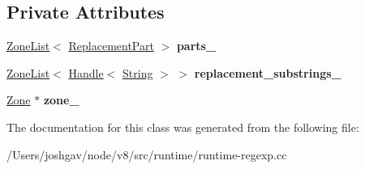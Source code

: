 \subsection*{Private Attributes}
\begin{DoxyCompactItemize}
\item 
\hyperlink{classv8_1_1internal_1_1_zone_list}{Zone\+List}$<$ \hyperlink{structv8_1_1internal_1_1_compiled_replacement_1_1_replacement_part}{Replacement\+Part} $>$ {\bfseries parts\+\_\+}\hypertarget{classv8_1_1internal_1_1_compiled_replacement_adfb6f149f488960b61955744d9223b0b}{}\label{classv8_1_1internal_1_1_compiled_replacement_adfb6f149f488960b61955744d9223b0b}

\item 
\hyperlink{classv8_1_1internal_1_1_zone_list}{Zone\+List}$<$ \hyperlink{classv8_1_1internal_1_1_handle}{Handle}$<$ \hyperlink{classv8_1_1internal_1_1_string}{String} $>$ $>$ {\bfseries replacement\+\_\+substrings\+\_\+}\hypertarget{classv8_1_1internal_1_1_compiled_replacement_a1a8f4d32550aafe310f8955b55ad2c20}{}\label{classv8_1_1internal_1_1_compiled_replacement_a1a8f4d32550aafe310f8955b55ad2c20}

\item 
\hyperlink{classv8_1_1internal_1_1_zone}{Zone} $\ast$ {\bfseries zone\+\_\+}\hypertarget{classv8_1_1internal_1_1_compiled_replacement_aafd22ca7913e134c3c5191eb0de024d6}{}\label{classv8_1_1internal_1_1_compiled_replacement_aafd22ca7913e134c3c5191eb0de024d6}

\end{DoxyCompactItemize}


The documentation for this class was generated from the following file\+:\begin{DoxyCompactItemize}
\item 
/\+Users/joshgav/node/v8/src/runtime/runtime-\/regexp.\+cc\end{DoxyCompactItemize}
